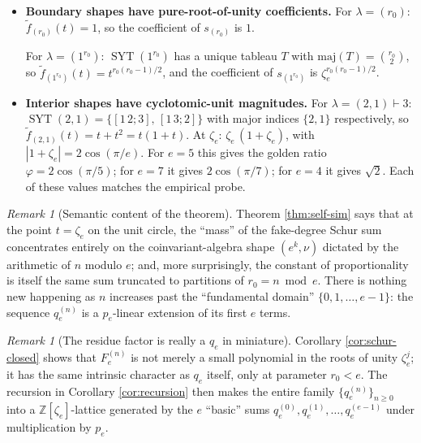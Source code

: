 \documentclass[11pt]{article}
\theoremstyle{remark}
\newtheorem{remark}[theorem]{Remark}
\DeclareMathOperator{\SYT}{SYT}
\newcommand{\ftilde}{\widetilde{f}}
\newcommand{\qe}{q_e}
\newcommand{\zetae}{\zeta_e}
\newcommand{\ZZ}{\mathbb{Z}}
\begin{document}
\begin{itemize}
  \item \textbf{Boundary shapes have pure-root-of-unity coefficients.}
  For $\lambda = (r_0)$: $\ftilde_{(r_0)}(t) = 1$, so the coefficient of $s_{(r_0)}$ is $1$.

  For $\lambda = (1^{r_0})$: $\SYT(1^{r_0})$ has a unique tableau $T$ with $\mathrm{maj}(T) = \binom{r_0}{2}$, so $\ftilde_{(1^{r_0})}(t) = t^{r_0(r_0-1)/2}$, and the coefficient of $s_{(1^{r_0})}$ is $\zetae^{r_0(r_0-1)/2}$.

  \item \textbf{Interior shapes have cyclotomic-unit magnitudes.}
  For $\lambda = (2,1) \vdash 3$: $\SYT(2,1) = \bigl\{[1\,2;3],\, [1\,3;2]\bigr\}$ with major indices $\{2, 1\}$ respectively, so $\ftilde_{(2,1)}(t) = t + t^2 = t(1+t)$. At $\zetae$: $\zetae\,(1 + \zetae)$, with $|1+\zetae| = 2\cos(\pi/e)$. For $e = 5$ this gives the golden ratio $\varphi = 2\cos(\pi/5)$; for $e = 7$ it gives $2\cos(\pi/7)$; for $e = 4$ it gives $\sqrt 2$. Each of these values matches the empirical probe.
\end{itemize}

\begin{remark}[Semantic content of the theorem]
Theorem \ref{thm:self-sim} says that at the point $t = \zetae$ on the unit circle, the ``mass'' of the fake-degree Schur sum concentrates entirely on the coinvariant-algebra shape $(e^k, \nu)$ dictated by the arithmetic of $n$ modulo $e$; and, more surprisingly, the constant of proportionality is itself the same sum truncated to partitions of $r_0 = n \bmod e$. There is nothing new happening as $n$ increases past the ``fundamental domain'' $\{0, 1, \ldots, e-1\}$: the sequence $\qe^{(n)}$ is a $p_e$-linear extension of its first $e$ terms.
\end{remark}

\begin{remark}[The residue factor is really a $q_e$ in miniature]
Corollary \ref{cor:schur-closed} shows that $F_e^{(n)}$ is not merely a small polynomial in the roots of unity $\zetae^j$; it has the same intrinsic character as $q_e$ itself, only at parameter $r_0 < e$. The recursion in Corollary \ref{cor:recursion} then makes the entire family $\{\qe^{(n)}\}_{n \ge 0}$ into a $\ZZ[\zetae]$-lattice generated by the $e$ ``basic'' sums $\qe^{(0)}, \qe^{(1)}, \ldots, \qe^{(e-1)}$ under multiplication by $p_e$.
\end{remark}
\end{document}

